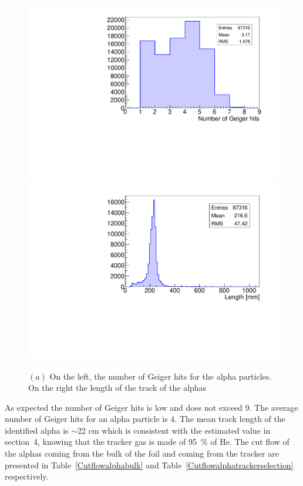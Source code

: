 \documentclass[main.tex]{subfiles}
\begin{document}
\begin{figure}[h!]
\begin{center}
\includegraphics[scale=0.33]{pictures/Chap5/source_selection_surface_gghits_alpha.pdf}
\includegraphics[scale=0.33]{pictures/Chap5/source_selection_surface_length_alpha.pdf}
\caption{$(a)$ On the left, the number of Geiger hits for the alpha particles. On the right the length of the track of the alphas}
\label{alphaLengthSSS}
\end{center}
\end{figure}


\noindent As expected the number of Geiger hits is low and does not exceed 9. The average number of Geiger hits for an alpha particle is 4. The mean track length of the identified alpha is $\sim$22 cm which is consistent with the estimated value in section~4, knowing that the tracker gas is made of 95~\% of He. The cut flow of the alphas coming from the bulk of the foil and coming from the tracker are presented in Table~\ref{Cutflowalphabulk} and Table~\ref{Cutflowalphatrackerselection} respectively. 
\end{document}
